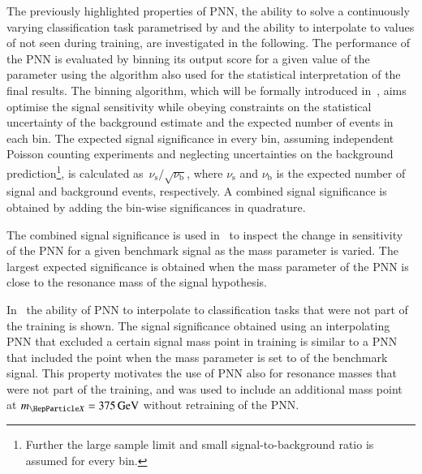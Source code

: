 The previously highlighted properties of PNN, the ability to solve a
continuously varying classification task parametrised by \mX and the
ability to interpolate to values of \mX not seen during training, are
investigated in the following. The performance of the PNN is evaluated
by binning its output score for a given value of the parameter using
the algorithm also used for the statistical interpretation of the
final results. The binning algorithm, which will be formally
introduced in~, aims optimise the signal
sensitivity while obeying constraints on the statistical uncertainty
of the background estimate and the expected number of events in each
bin. The expected signal significance in every bin, assuming
independent Poisson counting experiments and neglecting uncertainties
on the background prediction\footnote{Further the large sample limit
  and small signal-to-background ratio is assumed for every bin.}, is
calculated as~$\nu_\text{s} / \sqrt{\nu_\text{b}}$, where
$\nu_\text{s}$ and $\nu_\text{b}$ is the expected number of signal and
background events, respectively. A combined signal significance is
obtained by adding the bin-wise significances in quadrature.

The combined signal significance is used in~ to
inspect the change in sensitivity of the PNN for a given benchmark
signal as the mass parameter is varied. The largest expected
significance is obtained when the mass parameter of the PNN is close
to the resonance mass of the signal hypothesis.

In~ the ability of PNN to interpolate to
classification tasks that were not part of the training is shown. The
signal significance obtained using an interpolating PNN that excluded
a certain signal mass point in training is similar to a PNN that
included the point when the mass parameter is set to \mX of the
benchmark signal. This property motivates the use of PNN also for
resonance masses that were not part of the training, and was used to
include an additional mass point at $\mX = \SI{375}{\GeV}$ without
retraining of the PNN. %

